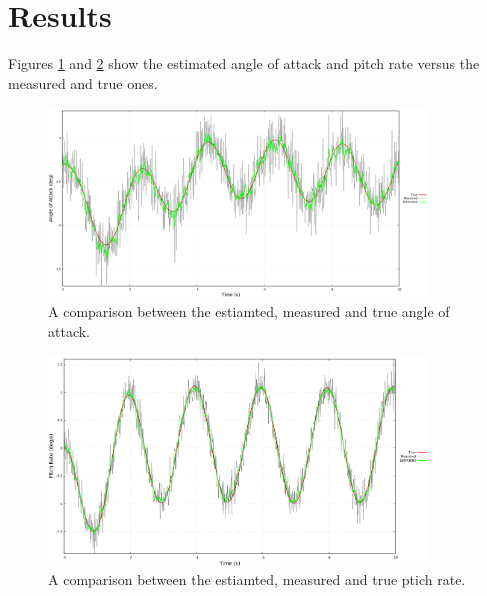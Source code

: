 \documentclass{article}
\begin{document}
\section{Results}
Figures \ref{Fig:Results_AoA} and \ref{Fig:Results_pitchRate} show the estimated angle of attack and pitch rate versus the measured and true ones.
\begin{figure}[h]
    \centering
    \includegraphics[width=0.9\textwidth]{results_AoA.png}
    \caption{A comparison between the estiamted, measured and true angle of attack.}
    \label{Fig:Results_AoA}
\end{figure}
\begin{figure}[h]
    \centering
    \includegraphics[width=0.9\textwidth]{results_q.png}
    \caption{A comparison between the estiamted, measured and true ptich rate.}
    \label{Fig:Results_pitchRate}
\end{figure}



\end{document}
